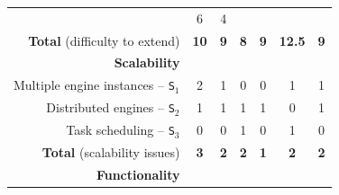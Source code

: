 \documentclass[preprint,3p,twocolumn]{elsarticle}
\newcommand{\correction}[1]{\color{blue}#1\color{black}\xspace}
\begin{document}
\begin{table}
\begin{tabular}{rcccccc}
                                     & \cellcolor[HTML]{999999}6
                                     & \cellcolor[HTML]{99DD99}4\\
  \textbf{Total} (difficulty to extend) & \cellcolor[HTML]{99D299}\textbf{10}
                                     & \cellcolor[HTML]{99E899}\textbf{\correction{9}}
                                     & \cellcolor[HTML]{99FF99}\textbf{8}
                                     & \cellcolor[HTML]{99E899}\textbf{9}
                                     & \cellcolor[HTML]{999999}\textbf{12.5}
                                     & \cellcolor[HTML]{99E899}\textbf{9}\\
\cellcolor[HTML]{EEEEEE}\textbf{Scalability}& \multicolumn{6}{l}{\cellcolor[HTML]{EEEEEE}}\\
Multiple engine instances -- \texttt{S$_1$}& \cellcolor[HTML]{999999}2
                                     & \cellcolor[HTML]{99CC99}1
                                     & \cellcolor[HTML]{99FF99}0
                                     & \cellcolor[HTML]{99FF99}0
                                     & \cellcolor[HTML]{99CC99}1
                                     & \cellcolor[HTML]{99CC99}1\\
Distributed engines -- \texttt{S$_2$}& \cellcolor[HTML]{999999}1
                                     & \cellcolor[HTML]{999999}1
                                     & \cellcolor[HTML]{999999}1
                                     & \cellcolor[HTML]{999999}1
                                     & \cellcolor[HTML]{99FF99}0
                                     & \cellcolor[HTML]{999999}1\\
Task scheduling -- \texttt{S$_3$}    & \cellcolor[HTML]{99FF99}0
                                     & \cellcolor[HTML]{99FF99}0
                                     & \cellcolor[HTML]{999999}1
                                     & \cellcolor[HTML]{99FF99}0
                                     & \cellcolor[HTML]{999999}1
                                     & \cellcolor[HTML]{99FF99}0\\
\textbf{Total} (scalability issues)  & \cellcolor[HTML]{999999}\textbf{3}
                                     & \cellcolor[HTML]{99CC99}\textbf{2}
                                     & \cellcolor[HTML]{99CC99}\textbf{2}
                                     & \cellcolor[HTML]{99FF99}\textbf{1}
                                     & \cellcolor[HTML]{99CC99}\textbf{2}
                                     & \cellcolor[HTML]{99CC99}\textbf{2}\\
\cellcolor[HTML]{EEEEEE}\textbf{\correction{Functionality}}& \multicolumn{6}{l}{\cellcolor[HTML]{EEEEEE}}\\

\end{tabular}
\end{table}
\end{document}
